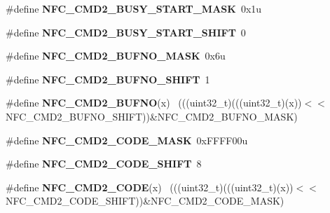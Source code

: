 \begin{DoxyCompactItemize}
\item 
\hypertarget{group___n_f_c___register___masks_gac18944028d4534e9dbd9401fa309bc05}{}\#define {\bfseries N\+F\+C\+\_\+\+C\+M\+D2\+\_\+\+B\+U\+S\+Y\+\_\+\+S\+T\+A\+R\+T\+\_\+\+M\+A\+S\+K}~0x1u\label{group___n_f_c___register___masks_gac18944028d4534e9dbd9401fa309bc05}

\item 
\hypertarget{group___n_f_c___register___masks_ga51df4add4c6c042e8ad48745b8c5299b}{}\#define {\bfseries N\+F\+C\+\_\+\+C\+M\+D2\+\_\+\+B\+U\+S\+Y\+\_\+\+S\+T\+A\+R\+T\+\_\+\+S\+H\+I\+F\+T}~0\label{group___n_f_c___register___masks_ga51df4add4c6c042e8ad48745b8c5299b}

\item 
\hypertarget{group___n_f_c___register___masks_ga3c1dd38d8c86a09b2280ff7b314dfbf9}{}\#define {\bfseries N\+F\+C\+\_\+\+C\+M\+D2\+\_\+\+B\+U\+F\+N\+O\+\_\+\+M\+A\+S\+K}~0x6u\label{group___n_f_c___register___masks_ga3c1dd38d8c86a09b2280ff7b314dfbf9}

\item 
\hypertarget{group___n_f_c___register___masks_gaf9e72a1c98285843edf1d3ced11b2ba1}{}\#define {\bfseries N\+F\+C\+\_\+\+C\+M\+D2\+\_\+\+B\+U\+F\+N\+O\+\_\+\+S\+H\+I\+F\+T}~1\label{group___n_f_c___register___masks_gaf9e72a1c98285843edf1d3ced11b2ba1}

\item 
\hypertarget{group___n_f_c___register___masks_gac667a4dc998ce97045d4ef2dee46087d}{}\#define {\bfseries N\+F\+C\+\_\+\+C\+M\+D2\+\_\+\+B\+U\+F\+N\+O}(x)                                            ~(((uint32\+\_\+t)(((uint32\+\_\+t)(x))$<$$<$N\+F\+C\+\_\+\+C\+M\+D2\+\_\+\+B\+U\+F\+N\+O\+\_\+\+S\+H\+I\+F\+T))\&N\+F\+C\+\_\+\+C\+M\+D2\+\_\+\+B\+U\+F\+N\+O\+\_\+\+M\+A\+S\+K)\label{group___n_f_c___register___masks_gac667a4dc998ce97045d4ef2dee46087d}

\item 
\hypertarget{group___n_f_c___register___masks_gad5ace38e58bd63198e893eac4ee8e5e1}{}\#define {\bfseries N\+F\+C\+\_\+\+C\+M\+D2\+\_\+\+C\+O\+D\+E\+\_\+\+M\+A\+S\+K}~0x\+F\+F\+F\+F00u\label{group___n_f_c___register___masks_gad5ace38e58bd63198e893eac4ee8e5e1}

\item 
\hypertarget{group___n_f_c___register___masks_gaabb79312bda770a6491fdbf13d2e3d4a}{}\#define {\bfseries N\+F\+C\+\_\+\+C\+M\+D2\+\_\+\+C\+O\+D\+E\+\_\+\+S\+H\+I\+F\+T}~8\label{group___n_f_c___register___masks_gaabb79312bda770a6491fdbf13d2e3d4a}

\item 
\hypertarget{group___n_f_c___register___masks_gaf7c38eabdb7c0e488a294bf404a163fa}{}\#define {\bfseries N\+F\+C\+\_\+\+C\+M\+D2\+\_\+\+C\+O\+D\+E}(x)                                              ~(((uint32\+\_\+t)(((uint32\+\_\+t)(x))$<$$<$N\+F\+C\+\_\+\+C\+M\+D2\+\_\+\+C\+O\+D\+E\+\_\+\+S\+H\+I\+F\+T))\&N\+F\+C\+\_\+\+C\+M\+D2\+\_\+\+C\+O\+D\+E\+\_\+\+M\+A\+S\+K)\label{group___n_f_c___register___masks_gaf7c38eabdb7c0e488a294bf404a163fa}


\end{DoxyCompactItemize}
